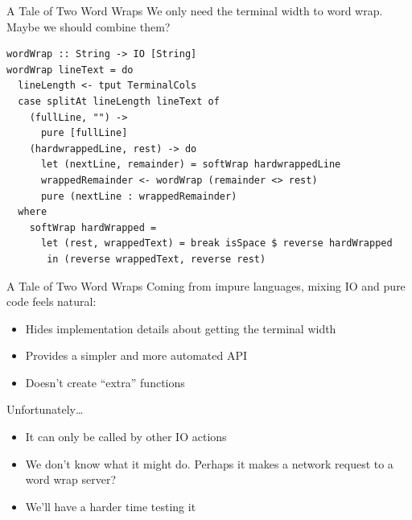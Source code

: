 \documentclass[10pt, presentation, colorlinks]{beamer}
\begin{document}
\begin{frame}[label={sec:org5ae31e9},fragile]{A Tale of Two Word Wraps}
 We only need the terminal width to word wrap. Maybe we should combine them?
\pause

\begin{verbatim}
wordWrap :: String -> IO [String]
wordWrap lineText = do
  lineLength <- tput TerminalCols
  case splitAt lineLength lineText of
    (fullLine, "") ->
      pure [fullLine]
    (hardwrappedLine, rest) -> do
      let (nextLine, remainder) = softWrap hardwrappedLine
      wrappedRemainder <- wordWrap (remainder <> rest)
      pure (nextLine : wrappedRemainder)
  where
    softWrap hardWrapped =
      let (rest, wrappedText) = break isSpace $ reverse hardWrapped
       in (reverse wrappedText, reverse rest)
\end{verbatim}
\end{frame}

\begin{frame}[label={sec:org587ff47}]{A Tale of Two Word Wraps}
Coming from impure languages, mixing IO and pure code feels natural:

\pause
\begin{itemize}
\item Hides implementation details about getting the terminal width
\end{itemize}
\pause
\begin{itemize}
\item Provides a simpler and more automated API
\end{itemize}
\pause
\begin{itemize}
\item Doesn't create “extra” functions
\end{itemize}

\bigskip
\pause
Unfortunately\ldots{}

\bigskip
\pause
\begin{itemize}
\item It can only be called by other IO actions
\end{itemize}
\pause
\begin{itemize}
\item We don't know what it might do. Perhaps it makes a network request to a word wrap server?
\end{itemize}
\pause
\begin{itemize}
\item We'll have a harder time testing it
\end{itemize}
\end{frame}
\end{document}
